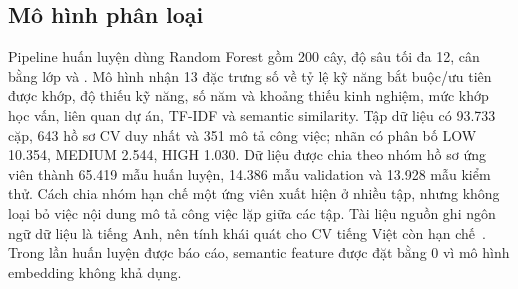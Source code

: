 \subsection{Mô hình phân loại}
Pipeline huấn luyện dùng Random Forest gồm 200 cây, độ sâu tối đa 12, cân bằng lớp và . Mô hình nhận 13 đặc trưng số về tỷ lệ kỹ năng bắt buộc/ưu tiên được khớp, độ thiếu kỹ năng, số năm và khoảng thiếu kinh nghiệm, mức khớp học vấn, liên quan dự án, TF-IDF và semantic similarity. Tập dữ liệu có 93.733 cặp, 643 hồ sơ CV duy nhất và 351 mô tả công việc; nhãn có phân bố LOW 10.354, MEDIUM 2.544, HIGH 1.030. Dữ liệu được chia theo nhóm hồ sơ ứng viên thành 65.419 mẫu huấn luyện, 14.386 mẫu validation và 13.928 mẫu kiểm thử. Cách chia nhóm hạn chế một ứng viên xuất hiện ở nhiều tập, nhưng không loại bỏ việc nội dung mô tả công việc lặp giữa các tập. Tài liệu nguồn ghi ngôn ngữ dữ liệu là tiếng Anh, nên tính khái quát cho CV tiếng Việt còn hạn chế~\cite{ResumeJobFit2026}. Trong lần huấn luyện được báo cáo, semantic feature được đặt bằng 0 vì mô hình embedding không khả dụng.
